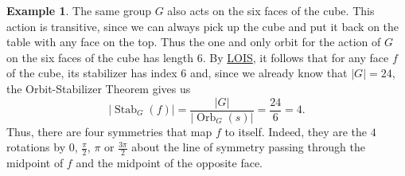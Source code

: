 \documentclass[12pt]{report}
\numberwithin{equation}{section}
\numberwithin{theorem}{chapter}
\theoremstyle{definition}
\newtheorem{example}[theorem]{Example}
\newtheorem*{basic properties}{Basic Properties}
\newtheorem*{Important Remark}{Important Remark}
\DeclareMathOperator{\Orb}{Orb}
\DeclareMathOperator{\Stab}{Stab}
\begin{document}
\begin{example}
The same group $G$ also acts on the six faces of the cube. This action is transitive, since we can always pick up the cube and put it back on the table with any face on the top. Thus the one and only orbit for the action of $G$ on the six faces of the cube has length $6$. By \hyperref[lois]{LOIS}, it follows that for any face $f$ of the cube, its stabilizer has index $6$ and, since we already know that $|G|= 24$, the Orbit-Stabilizer Theorem gives us
$$|\Stab_G(f)| = \frac{|G|}{|\Orb_G(s)|} = \frac{24}{6} = 4.$$ 
Thus, there are four symmetries that map $f$ to itself. Indeed, they are the $4$ rotations by $0$, $\frac{\pi}{2}$, $\pi$ or $\frac{3\pi}{2}$ about the line of symmetry passing through the midpoint of $f$ and the midpoint of the opposite face.
\end{example}
\end{document}
